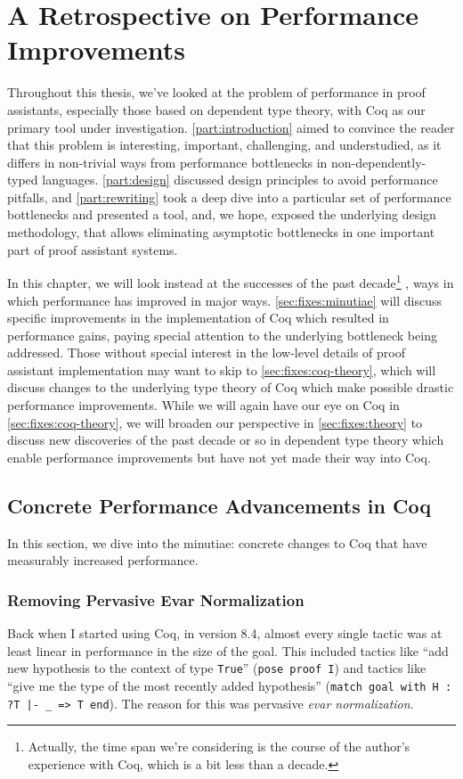 \chapter{A Retrospective on Performance Improvements} \label{ch:coq-tooling-fixes}
Throughout this thesis, we've looked at the problem of performance in proof assistants, especially those based on dependent type theory, with Coq as our primary tool under investigation.
\autoref{part:introduction} aimed to convince the reader that this problem is interesting, important, challenging, and understudied, as it differs in non-trivial ways from performance bottlenecks in non-dependently-typed languages.
\autoref{part:design} discussed design principles to avoid performance pitfalls, and \autoref{part:rewriting} took a deep dive into a particular set of performance bottlenecks and presented a tool, and, we hope, exposed the underlying design methodology, that allows eliminating asymptotic bottlenecks in one important part of proof assistant systems.

In this chapter, we will look instead at the successes of the past decade\footnote{%
  Actually, the time span we're considering is the course of the author's experience with Coq, which is a bit less than a decade.%
}%
, ways in which performance has improved in major ways.
\autoref{sec:fixes:minutiae} will discuss specific improvements in the implementation of Coq which resulted in performance gains, paying special attention to the underlying bottleneck being addressed.
Those without special interest in the low-level details of proof assistant implementation may want to skip to \autoref{sec:fixes:coq-theory}, which will discuss changes to the underlying type theory of Coq which make possible drastic performance improvements.
While we will again have our eye on Coq in \autoref{sec:fixes:coq-theory}, we will broaden our perspective in \autoref{sec:fixes:theory} to discuss new discoveries of the past decade or so in dependent type theory which enable performance improvements but have not yet made their way into Coq.

\section{Concrete Performance Advancements in Coq}\label{sec:fixes:minutiae}
In this section, we dive into the minutiae: concrete changes to Coq that have measurably increased performance.
\subsection{Removing Pervasive Evar Normalization}\label{sec:econstr}
Back when I started using Coq, in version 8.4, almost every single tactic was at least linear in performance in the size of the goal.
This included tactics like ``add new hypothesis to the context of type \texttt{True}'' (\texttt{pose proof I}) and tactics like ``give me the type of the most recently added hypothesis'' (\texttt{match goal with H : ?T |- _ => T end}).
The reason for this was pervasive \emph{evar normalization}.

